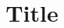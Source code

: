 \documentclass[withoutpreface,bwprint]{cumcmthesis}
\title{Title}
\begin{document}
 \maketitle
\renewcommand{\abstractname}{Abstract}
\renewcommand{\keywords}{\textbf{Keywords：}}
\begin{abstract}
\begin{spacing}{1.6}

\end{spacing}
\large


\end{abstract}

\newpage
{
	\tableofcontents
}
\newpage

%

 







%
%
%

\newpage

\end{document}
